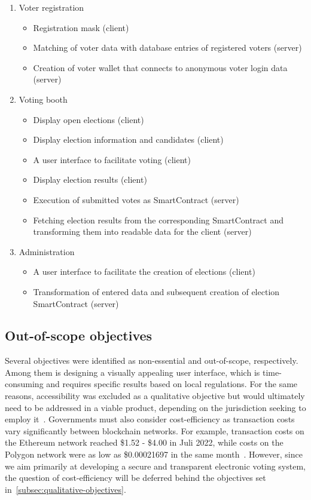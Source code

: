 \begin{enumerate}
    \item Voter registration
    \begin{itemize}
        \item Registration mask (client)
        \item Matching of voter data with database entries of registered voters (server)
        \item Creation of voter wallet that connects to anonymous voter login data (server)
    \end{itemize}
    \item Voting booth
    \begin{itemize}
        \item Display open elections (client)
        \item Display election information and candidates (client)
        \item A user interface to facilitate voting (client)
        \item Display election results (client)
        \item Execution of submitted votes as \gls{SmartContract} (server)
        \item Fetching election results from the corresponding \gls{SmartContract} and transforming them into readable data for the client (server)
    \end{itemize}
    \item Administration
    \begin{itemize}
        \item A user interface to facilitate the creation of elections (client)
        \item Transformation of entered data and subsequent creation of election \gls{SmartContract} (server)
    \end{itemize}
\end{enumerate}

\subsection{Out-of-scope objectives}\label{subsec:out-of-scope-objectives}

Several objectives were identified as non-essential and out-of-scope, respectively.
Among them is designing a visually appealing user interface, which is time-consuming and requires specific results based on local regulations.
For the same reasons, accessibility was excluded as a qualitative objective but would ultimately need to be addressed in a viable product, depending on the jurisdiction seeking to employ it~\autocites{laskowski_promoting_2022}[sections 2.2, 2.7]{lowry_desirable_2009}.
Governments must also consider cost-efficiency as transaction costs vary significantly between blockchain networks.
For example, transaction costs on the Ethereum network reached \$1.52 - \$4.00 in Juli 2022, while costs on the Polygon network were as low as \$0.00021697 in the same month~\autocite{shrivastava_ethereum_2022}.
However, since we aim primarily at developing a secure and transparent electronic voting system, the question of cost-efficiency will be deferred behind the objectives set in~\cref{subsec:qualitative-objectives}.

